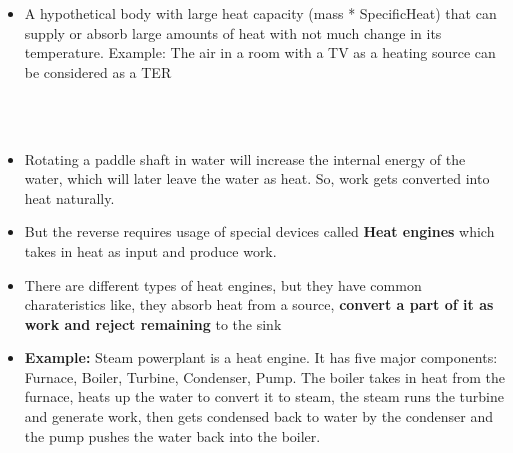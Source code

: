 \documentclass[8pt]{article}
\begin{document}
\hrulefill
\begin{center}
\subsection*{}
\end{center}
\\
		\begin{itemize}[labelindent=1cm, leftmargin=1cm, wide]
			\item A hypothetical body with large heat capacity (mass * SpecificHeat) that can supply or absorb large amounts of heat with not much change in its temperature. Example: The air in a room with a TV as a heating source can be considered as a TER
		\end{itemize}
		\hrulefill\\
\\
		\begin{itemize}[wide]
			\item Rotating a paddle shaft in water will increase the internal energy of the water, which will later leave the water as heat. So, work gets converted into heat naturally. 
			\item But the reverse requires usage of special devices called \textbf{Heat engines} which takes in heat as input and produce work. 
			\item There are different types of heat engines, but they have common charateristics like, they absorb heat from a source,\textbf{ convert a part of it as work and reject remaining} to the sink
			\item \textbf{Example:} Steam powerplant is a heat engine. It has five major components: Furnace, Boiler, Turbine, Condenser, Pump. The boiler takes in heat from the furnace, heats up the water to convert it to steam, the steam runs the turbine and generate work, then gets condensed back to water by the condenser and the pump pushes the water back into the boiler.  
		\end{itemize}
		\hrulefill\\
\\
\end{document}
